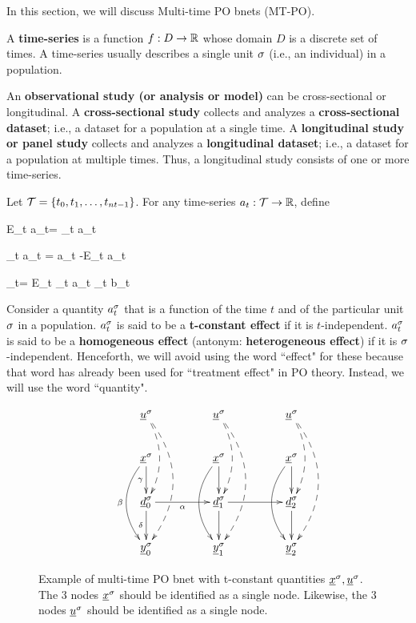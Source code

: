 In this section, we will
discuss Multi-time PO bnets (MT-PO).

A {\bf time-series} is a function $f:D\rightarrow { \mathbb{R}}$
whose domain $D$ is a discrete set
of times. A time-series 
usually describes a single
unit $\sigma$ (i.e., an individual)
in a population.

An {\bf observational study (or analysis or model)}
can be cross-sectional or longitudinal.
A {\bf cross-sectional study} 
collects and analyzes a {\bf cross-sectional dataset};
i.e., a dataset for a population
at a single time. A {\bf longitudinal study
or panel study} collects and analyzes 
a {\bf longitudinal dataset};
i.e., a dataset for a population
at  multiple times. 
Thus, a longitudinal study 
consists of one or more time-series.

Let ${\cal T}=\{t_0, t_1, \ldots, t_{nt-1}\}$.
For any time-series $a_t: {\cal T}\rightarrow{ \mathbb{R}}$,
define

\beq
E_t a_t=
\sum_{t\in \calt} a_t
\eeq

\beq
\Delta_t a_t = a_t -E_t a_t
\eeq

\beq
{}_t= E_t \Delta_t a_t \Delta_t b_t
\eeq

Consider a quantity $a^\sigma_t$
that is a function of  the time $t$
and of the particular unit $\sigma$
in a population.
$a^\sigma_t$ is said to be a
 {\bf t-constant effect} 
if it is $t$-independent.
$a^\sigma_t$ is said to be a
{\bf homogeneous effect}
(antonym: {\bf heterogeneous effect})
if it is
$\sigma$-independent.
Henceforth, we will avoid 
using the word ``effect" for these
because that word
 has already been used for 
``treatment effect" in
PO theory.
Instead, we will use the word ``quantity".

\begin{figure}[h!]
$$\xymatrix @C=4pc {
\rvu^\s\ar@/^1pc/@{-->}[dd]\ar@/^2pc/@{-->}[ddd]
&\rvu^\s\ar@/^1pc/@{-->}[dd]\ar@/^2pc/@{-->}[ddd]
&\rvu^\s\ar@/^1pc/@{-->}[dd]\ar@/^2pc/@{-->}[ddd]
\\
\rvx^\s\ar[d]_\gamma\ar@/_1.5pc/[dd]_\beta
&\rvx^\s\ar[d]\ar@/_1.5pc/[dd]
&\rvx^\s\ar[d]\ar@/_1.5pc/[dd]
\\
\rvd^\s_0\ar[d]_\delta\ar[r]_\alp
&\rvd^\s_1\ar[d]\ar[r]
&\rvd^\s_2\ar[d]
\\
\rvy^\s_0
&\rvy^\s_1
&\rvy^\s_2
}$$
\caption{Example 
of multi-time PO bnet
with t-constant quantities ${\underline{x}}^\sigma, {\underline{u}}^\sigma$.
The 
3 nodes ${\underline{x}}^\sigma$
should be identified
as a single node. 
 Likewise, the 
3 nodes ${\underline{u}}^\sigma$
should be identified
as a single node. 
}
\label{fig-dynamic-po}
\end{figure}


